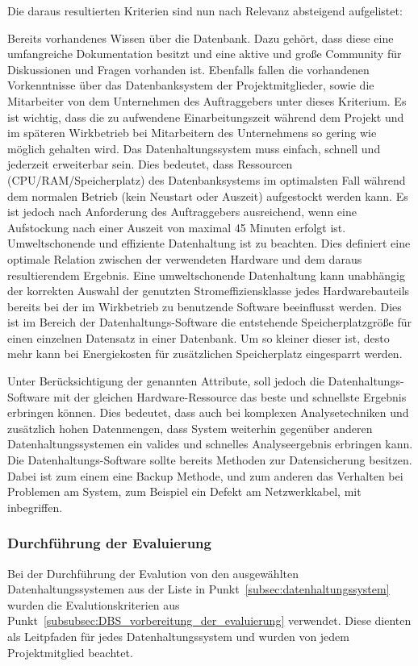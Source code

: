 Die daraus resultierten Kriterien sind nun nach Relevanz absteigend
aufgelistet:
\begin{outline}
  \1 Bereits vorhandenes Wissen über die Datenbank. Dazu gehört, dass diese
  eine umfangreiche Dokumentation besitzt und eine aktive und große Community
  für Diskussionen und Fragen vorhanden ist. Ebenfalls fallen die vorhandenen
  Vorkenntnisse über das Datenbanksystem der Projektmitglieder, sowie die
  Mitarbeiter von dem Unternehmen des Auftraggebers unter dieses Kriterium. Es
  ist wichtig, dass die zu aufwendene Einarbeitungszeit während dem Projekt und
  im späteren Wirkbetrieb bei Mitarbeitern des Unternehmens so gering wie
  möglich gehalten wird.
  \1 Das Datenhaltungssystem muss einfach, schnell und jederzeit erweiterbar
  sein. Dies bedeutet, dass Ressourcen (CPU/RAM/Speicherplatz) des
  Datenbanksystems im optimalsten Fall während dem normalen Betrieb (kein
  Neustart oder Auszeit) aufgestockt werden kann. Es ist jedoch nach
  Anforderung des Auftraggebers ausreichend, wenn eine Aufstockung nach einer
  Auszeit von maximal 45 Minuten erfolgt ist.
  \1 Umweltschonende und effiziente Datenhaltung ist zu beachten. Dies
  definiert eine optimale Relation zwischen der verwendeten Hardware und dem
  daraus resultierendem Ergebnis. Eine umweltschonende Datenhaltung kann
  unabhängig der korrekten Auswahl der genutzten Stromeffiziensklasse jedes
  Hardwarebauteils bereits bei der im Wirkbetrieb zu benutzende Software
  beeinflusst werden.  Dies ist im Bereich der Datenhaltungs-Software die
  entstehende Speicherplatzgröße für einen einzelnen Datensatz in einer
  Datenbank. Um so kleiner dieser ist, desto mehr kann bei Energiekosten für
  zusätzlichen Speicherplatz eingesparrt werden.

  Unter Berücksichtigung der genannten Attribute, soll jedoch die
  Datenhaltungs-Software mit der gleichen Hardware-Ressource das beste und
  schnellste Ergebnis erbringen können. Dies bedeutet, dass auch bei komplexen
  Analysetechniken und zusätzlich hohen Datenmengen, dass System weiterhin
  gegenüber anderen Datenhaltungssystemen ein valides und schnelles
  Analyseergebnis erbringen kann.
  \1 Die Datenhaltungs-Software sollte bereits Methoden zur Datensicherung
  besitzen. Dabei ist zum einem eine Backup Methode, und zum anderen das
  Verhalten bei Problemen am System, zum Beispiel ein Defekt am Netzwerkkabel,
  mit inbegriffen.
\end{outline}
\nl%

\subsubsection{Durchführung der Evaluierung}
\label{subsubsec:durchfuehrung_der_evaluierung}
Bei der Durchführung der Evalution von den ausgewählten Datenhaltungssystemen
aus der Liste in Punkt~\ref{subsec:datenhaltungssystem} wurden die
Evalutionskriterien aus Punkt~\ref{subsubsec:DBS_vorbereitung_der_evaluierung}
verwendet. Diese dienten als Leitpfaden für jedes Datenhaltungssystem und
wurden von jedem Projektmitglied beachtet.

